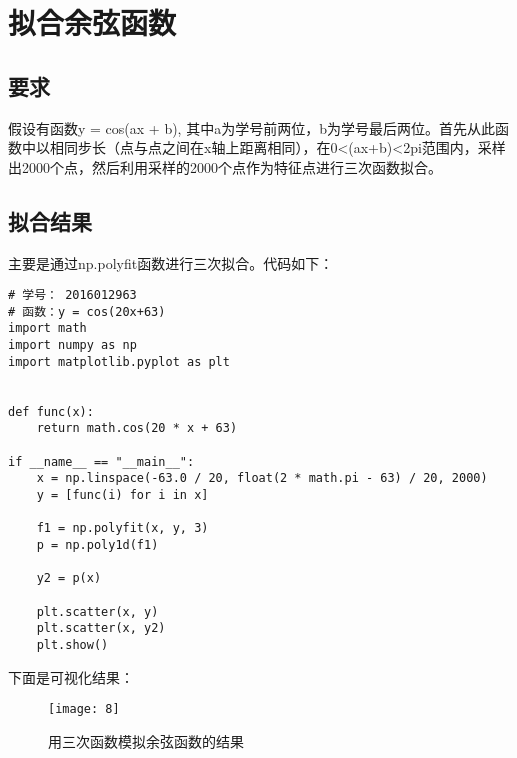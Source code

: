 \documentclass{article}
\begin{document}
    \section{拟合余弦函数}
       
		\subsection{要求}
		
		假设有函数y = cos(ax + b), 其中a为学号前两位，b为学号最后两位。首先从此函数中以相同步长（点与点之间在x轴上距离相同），在0<(ax+b)<2pi范围内，采样出2000个点，然后利用采样的2000个点作为特征点进行三次函数拟合。
		
		\subsection{拟合结果}
		
		主要是通过np.polyfit函数进行三次拟合。代码如下：

\begin{lstlisting}
# 学号： 2016012963
# 函数：y = cos(20x+63)
import math
import numpy as np
import matplotlib.pyplot as plt


def func(x):
	return math.cos(20 * x + 63)

if __name__ == "__main__":
	x = np.linspace(-63.0 / 20, float(2 * math.pi - 63) / 20, 2000)
	y = [func(i) for i in x]
	
	f1 = np.polyfit(x, y, 3)
	p = np.poly1d(f1)
	
	y2 = p(x)
	
	plt.scatter(x, y)
	plt.scatter(x, y2)
	plt.show()
\end{lstlisting}
		
		下面是可视化结果：
		
		\begin{figure}[H]
			\centering
			\texttt{[image: 8]}
			\caption{用三次函数模拟余弦函数的结果}
			\label{fig:8}
		\end{figure}      
    
\end{document}
